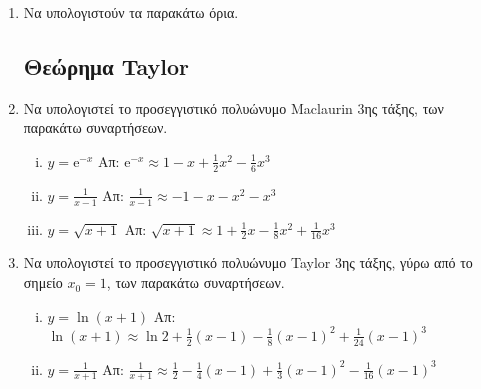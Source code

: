 \begin{enumerate}
    \item Να υπολογιστούν τα παρακάτω όρια.
      \begin{enumerate}[i)]
      \end{enumerate}


      \subsection*{Θεώρημα Taylor}

    \item Να υπολογιστεί το προσεγγιστικό πολυώνυμο Maclaurin 3ης τάξης, των 
      παρακάτω συναρτήσεων.
      \begin{enumerate}[i)]
        \item $ y= \mathrm{e}^{-x} $ 
          \hfill Απ: $ \mathrm{e}^{-x} \approx 1-x+ \frac{1}{2} x^{2} - 
          \frac{1}{6} x^{3} $ 
        \item $ y= \frac{1}{x-1} $ \hfill Απ: $ \frac{1}{x-1} 
          \approx -1 -x -x^{2} - x^{3} $ 
        \item $ y= \sqrt{x+1} $ \hfill Απ: $ \sqrt{x+1} \approx 1 + \frac{1}{2} x -
          \frac{1}{8} x^{2} + \frac{1}{16} x^{3} $ 
      \end{enumerate}

    \item Να υπολογιστεί το προσεγγιστικό πολυώνυμο Taylor 3ης τάξης, γύρω από 
      το σημείο $ x_{0}=1 $, των παρακάτω συναρτήσεων.
      \begin{enumerate}[i)]
        \item $ y= \ln{(x+1)} $ 
          \hfill Απ: $ \ln{(x+1)} \approx \ln{2} + \frac{1}{2} (x-1) - \frac{1}{8}
          (x-1)^{2} + \frac{1}{24} (x-1)^{3} $ 
        \item $ y= \frac{1}{x+1} $ \hfill Απ: $ \frac{1}{x+1} \approx \frac{1}{2} -
          \frac{1}{4} (x-1) + \frac{1}{3} (x-1)^{2} - \frac{1}{16} (x-1)^{3} $ 
      \end{enumerate}


\end{enumerate}
